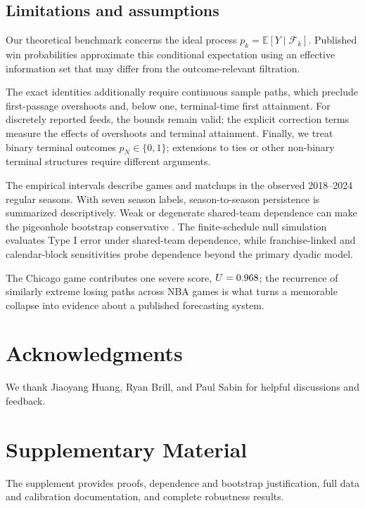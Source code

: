 \documentclass[12pt,letterpaper]{article}  %
\newcommand{\E}{\mathbb{E}}
\theoremstyle{plain}
\theoremstyle{definition}
\begin{document}
\subsection{Limitations and assumptions}

Our theoretical benchmark concerns the ideal process $p_k=\E[Y\mid\mathcal F_k]$.
Published win probabilities approximate this conditional expectation using an effective information set that may differ from the outcome-relevant filtration.

The exact identities additionally require continuous sample paths, which preclude first-passage overshoots and, below one, terminal-time first attainment.
For discretely reported feeds, the bounds remain valid; the explicit correction terms measure the effects of overshoots and terminal attainment.
Finally, we treat binary terminal outcomes $p_N\in\{0,1\}$; extensions to ties or other non-binary terminal structures require different arguments.

The empirical intervals describe games and matchups in the observed 2018--2024 regular seasons.
With seven season labels, season-to-season persistence is summarized descriptively.
Weak or degenerate shared-team dependence can make the pigeonhole bootstrap conservative \citep{Menzel2021}.
The finite-schedule null simulation evaluates Type I error under shared-team dependence, while franchise-linked and calendar-block sensitivities probe dependence beyond the primary dyadic model.

The Chicago game contributes one severe score, $U=0.968$; the recurrence of similarly extreme losing paths across \NBAGames{} NBA games is what turns a memorable collapse into evidence about a published forecasting system.

\section*{Acknowledgments}

We thank Jiaoyang Huang, Ryan Brill, and Paul Sabin for helpful discussions and feedback.

\section*{Supplementary Material}

The supplement provides proofs, dependence and bootstrap justification, full data and calibration documentation, and complete robustness results.



\end{document}
